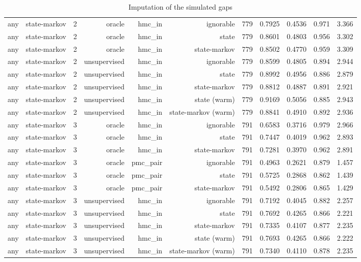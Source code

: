 \begin{table}[ht]
\begin{tabular}{llrrrrrrrrr}
any & state-markov & 2 & oracle & hmc\_in & ignorable & 779 & 0.7925 & 0.4536 & 0.971 & 3.366 \\
any & state-markov & 2 & oracle & hmc\_in & state & 779 & 0.8601 & 0.4803 & 0.956 & 3.302 \\
any & state-markov & 2 & oracle & hmc\_in & state-markov & 779 & 0.8502 & 0.4770 & 0.959 & 3.309 \\
any & state-markov & 2 & unsupervised & hmc\_in & ignorable & 779 & 0.8599 & 0.4805 & 0.894 & 2.944 \\
any & state-markov & 2 & unsupervised & hmc\_in & state & 779 & 0.8992 & 0.4956 & 0.886 & 2.879 \\
any & state-markov & 2 & unsupervised & hmc\_in & state-markov & 779 & 0.8812 & 0.4887 & 0.891 & 2.921 \\
any & state-markov & 2 & unsupervised & hmc\_in & state (warm) & 779 & 0.9169 & 0.5056 & 0.885 & 2.943 \\
any & state-markov & 2 & unsupervised & hmc\_in & state-markov (warm) & 779 & 0.8841 & 0.4910 & 0.892 & 2.936 \\
any & state-markov & 3 & oracle & hmc\_in & ignorable & 791 & 0.6583 & 0.3716 & 0.979 & 2.966 \\
any & state-markov & 3 & oracle & hmc\_in & state & 791 & 0.7447 & 0.4019 & 0.962 & 2.893 \\
any & state-markov & 3 & oracle & hmc\_in & state-markov & 791 & 0.7281 & 0.3970 & 0.962 & 2.891 \\
any & state-markov & 3 & oracle & pmc\_pair & ignorable & 791 & 0.4963 & 0.2621 & 0.879 & 1.457 \\
any & state-markov & 3 & oracle & pmc\_pair & state & 791 & 0.5725 & 0.2868 & 0.862 & 1.439 \\
any & state-markov & 3 & oracle & pmc\_pair & state-markov & 791 & 0.5492 & 0.2806 & 0.865 & 1.429 \\
any & state-markov & 3 & unsupervised & hmc\_in & ignorable & 791 & 0.7192 & 0.4045 & 0.882 & 2.257 \\
any & state-markov & 3 & unsupervised & hmc\_in & state & 791 & 0.7692 & 0.4265 & 0.866 & 2.221 \\
any & state-markov & 3 & unsupervised & hmc\_in & state-markov & 791 & 0.7335 & 0.4107 & 0.877 & 2.235 \\
any & state-markov & 3 & unsupervised & hmc\_in & state (warm) & 791 & 0.7693 & 0.4265 & 0.866 & 2.222 \\
any & state-markov & 3 & unsupervised & hmc\_in & state-markov (warm) & 791 & 0.7340 & 0.4110 & 0.878 & 2.235 \\
\bottomrule
\end{tabular}
\caption{Imputation of the simulated gaps}
\end{table}
